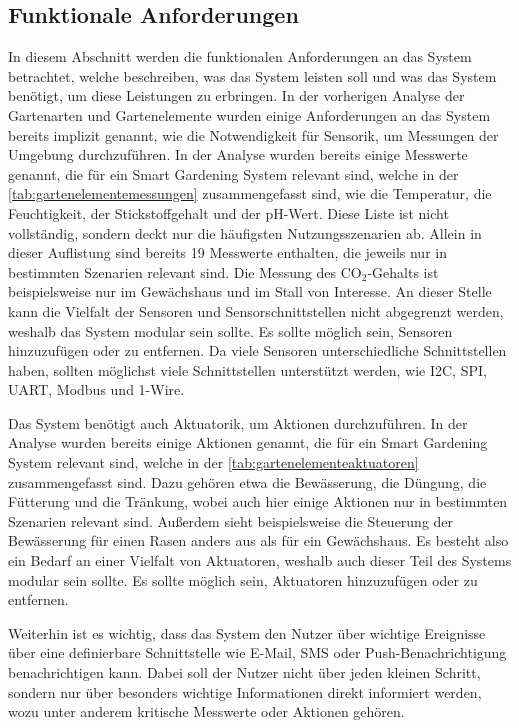 \subsection{Funktionale Anforderungen}
In diesem Abschnitt werden die funktionalen Anforderungen an das System betrachtet, welche beschreiben, was das System leisten soll und was das System benötigt, um diese Leistungen zu erbringen.
In der vorherigen Analyse der Gartenarten und Gartenelemente wurden einige Anforderungen an das System bereits implizit genannt, wie die Notwendigkeit für Sensorik, um Messungen der Umgebung durchzuführen.
In der Analyse wurden bereits einige Messwerte genannt, die für ein Smart Gardening System relevant sind, welche in der \cref{tab:gartenelementemessungen} zusammengefasst sind, wie die Temperatur, die Feuchtigkeit, der Stickstoffgehalt und der pH-Wert.
Diese Liste ist nicht vollständig, sondern deckt nur die häufigsten Nutzungsszenarien ab.
Allein in dieser Auflistung sind bereits 19 Messwerte enthalten, die jeweils nur in bestimmten Szenarien relevant sind.
Die Messung des CO$_2$-Gehalts ist beispielsweise nur im Gewächshaus und im Stall von Interesse.
An dieser Stelle kann die Vielfalt der Sensoren und Sensorschnittstellen nicht abgegrenzt werden, weshalb das System modular sein sollte.
Es sollte möglich sein, Sensoren hinzuzufügen oder zu entfernen.
Da viele Sensoren unterschiedliche Schnittstellen haben, sollten möglichst viele Schnittstellen unterstützt werden, wie I2C, SPI, UART, Modbus und 1-Wire. 

Das System benötigt auch Aktuatorik, um Aktionen durchzuführen.
In der Analyse wurden bereits einige Aktionen genannt, die für ein Smart Gardening System relevant sind, welche in der \cref{tab:gartenelementeaktuatoren} zusammengefasst sind.
Dazu gehören etwa die Bewässerung, die Düngung, die Fütterung und die Tränkung, wobei auch hier einige Aktionen nur in bestimmten Szenarien relevant sind.
Außerdem sieht beispielsweise die Steuerung der Bewässerung für einen Rasen anders aus als für ein Gewächshaus.
Es besteht also ein Bedarf an einer Vielfalt von Aktuatoren, weshalb auch dieser Teil des Systems modular sein sollte.
Es sollte möglich sein, Aktuatoren hinzuzufügen oder zu entfernen.

Weiterhin ist es wichtig, dass das System den Nutzer über wichtige Ereignisse über eine definierbare Schnittstelle wie E-Mail, SMS oder Push-Benachrichtigung benachrichtigen kann.
Dabei soll der Nutzer nicht über jeden kleinen Schritt, sondern nur über besonders wichtige Informationen direkt informiert werden, wozu unter anderem kritische Messwerte oder Aktionen gehören.

